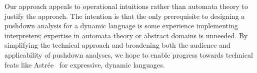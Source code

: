 Our approach appeals to operational intuitions rather than automata theory to justify the approach.
%
The intention is that the only prerequisite to designing a pushdown
analysis for a dynamic language is some experience implementing
interpreters; expertise in automata theory or abstract domains is
unneeded.
%
By simplifying the technical approach and broadening both the audience
and applicability of pushdown analyses, we hope to enable progress
towards technical feats like
Astr\'ee~\citep{dvanhorn:CousotEtAl-TASE07}
for expressive, dynamic languages.
%
